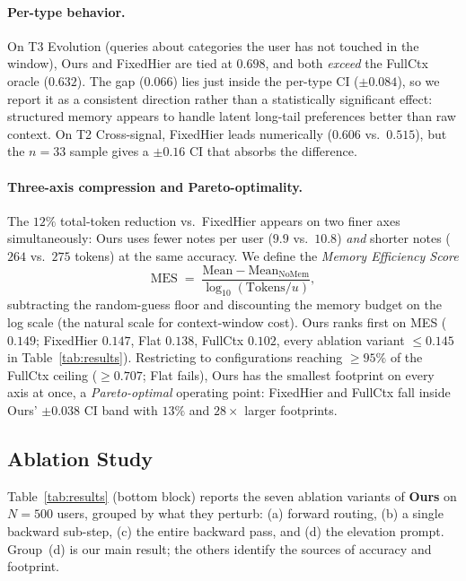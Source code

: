 \documentclass[sigconf,review,anonymous]{acmart}
\begin{document}
\paragraph{Per-type behavior.}
On T3 Evolution (queries about categories the user has not touched in the window), Ours and FixedHier are tied at \(0.698\), and both \emph{exceed} the FullCtx oracle (\(0.632\)). The gap (\(0.066\)) lies just inside the per-type CI (\(\pm 0.084\)), so we report it as a consistent direction rather than a statistically significant effect: structured memory appears to handle latent long-tail preferences better than raw context. On T2 Cross-signal, FixedHier leads numerically (\(0.606\) vs.\ \(0.515\)), but the \(n{=}33\) sample gives a \(\pm 0.16\) CI that absorbs the difference.

\paragraph{Three-axis compression and Pareto-optimality.}
The \(12\%\) total-token reduction vs.\ FixedHier appears on two finer axes simultaneously: Ours uses fewer notes per user (\(9.9\) vs.\ \(10.8\)) \emph{and} shorter notes (\(264\) vs.\ \(275\) tokens) at the same accuracy. We define the \emph{Memory Efficiency Score}
\begin{equation}
\label{eq:mes}
\mathrm{MES} \;=\; \frac{\mathrm{Mean} - \mathrm{Mean}_{\mathrm{NoMem}}}{\log_{10}(\mathrm{Tokens}/u)},
\end{equation}
subtracting the random-guess floor and discounting the memory budget on the log scale (the natural scale for context-window cost). Ours ranks first on MES (\(0.149\); FixedHier \(0.147\), Flat \(0.138\), FullCtx \(0.102\), every ablation variant \(\leq 0.145\) in Table~\ref{tab:results}). Restricting to configurations reaching \(\geq 95\%\) of the FullCtx ceiling (\(\geq 0.707\); Flat fails), Ours has the smallest footprint on every axis at once, a \emph{Pareto-optimal} operating point: FixedHier and FullCtx fall inside Ours' \(\pm 0.038\) CI band with \(13\%\) and \(28\times\) larger footprints.

\subsection{Ablation Study}
\label{sec:ablation}

Table~\ref{tab:results} (bottom block) reports the seven ablation variants of \textbf{Ours} on \(N{=}500\) users, grouped by what they perturb: (a) forward routing, (b) a single backward sub-step, (c) the entire backward pass, and (d) the elevation prompt. Group~(d) is our main result; the others identify the sources of accuracy and footprint.
\end{document}
